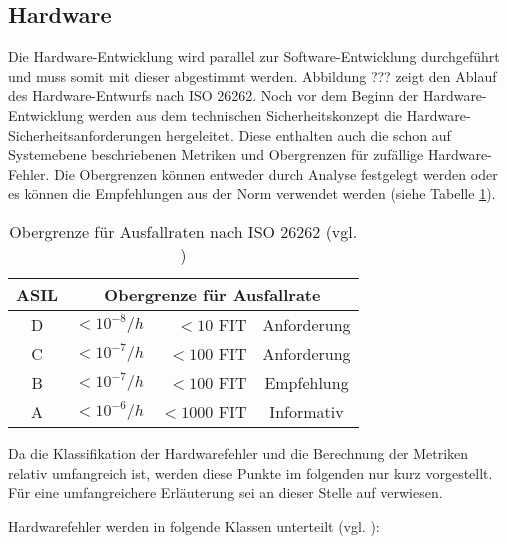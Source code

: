 \documentclass[a4paper,DIV=calc,ngerman]{scrartcl}
\begin{document}
\subsection{Hardware}
\label{sec:Hardware}
Die Hardware-Entwicklung wird parallel zur Software-Entwicklung durchgeführt und muss somit mit dieser abgestimmt werden. Abbildung ??? zeigt den Ablauf des Hardware-Entwurfs nach ISO 26262. Noch vor dem Beginn der Hardware-Entwicklung werden aus dem technischen Sicherheitskonzept die Hardware-Sicherheitsanforderungen hergeleitet. Diese enthalten auch die schon auf Systemebene beschriebenen Metriken und Obergrenzen für zufällige Hardware-Fehler. Die Obergrenzen können entweder durch Analyse festgelegt werden oder es können die Empfehlungen aus der Norm verwendet werden (siehe Tabelle \ref{tab:ausfallrate}). 

\begin{table}[h]
\center
\begin{tabular}[h]{c r r c}
\toprule
ASIL & \multicolumn{3}{c}{Obergrenze für Ausfallrate}\\
\midrule
D & $ <10^{-8}/h $ & $ <10 $ FIT & Anforderung\\
C & $ <10^{-7}/h $ & $ <100 $ FIT   & Anforderung\\
B & $ <10^{-7}/h $ & $ <100 $ FIT   & Empfehlung\\
A & $ <10^{-6}/h $ & $ <1000 $ FIT   & Informativ\\
\bottomrule
\end{tabular}
\caption{Obergrenze für Ausfallraten nach ISO 26262 (vgl. \cite[S. 133]{1})}
\label{tab:ausfallrate}
\end{table}

Da die Klassifikation der Hardwarefehler und die Berechnung der Metriken relativ umfangreich ist, werden diese Punkte im folgenden nur kurz vorgestellt. Für eine umfangreichere Erläuterung sei an dieser Stelle auf \cite[S. 135 ff.]{1} verwiesen.

Hardwarefehler werden in folgende Klassen unterteilt (vgl. \cite[S. 136]{1}):
\end{document}
